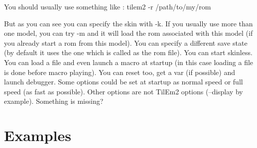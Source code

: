 \documentclass[10pt]{report}
\begin{document}
You should usually use something like : \newline
tilem2 -r /path/to/my/rom\newline\newline

But as you can see you can specify the skin with -k.\newline
If you usually use more than one model, you can try -m and it will load the rom associated with this model (if you already start a rom from this model).\newline
You can specify a different save state (by default it uses the one which is called as the rom file).\newline
You can start skinless.\newline
You can load a file and even launch a macro at startup (in this case loading a file is done before macro playing).\newline
You can reset too, get a var (if possible) and launch debugger.\newline
Some options could be set at startup as normal speed or full speed (as fast as possible).\newline
Other options are not TilEm2 options (--display by example).\newline
Something is missing?\newline

\section{Examples}
\end{document}
